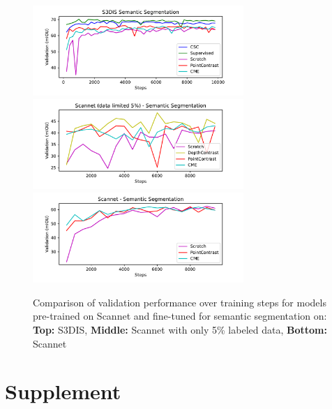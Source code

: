 \documentclass[10pt,twocolumn,letterpaper]{article}
\begin{document}
\begin{figure}[h!]
    \centering
    \includegraphics[width=8cm]{images/plots/s3dis_semantic.pdf}
    \includegraphics[width=8cm]{images/plots/scannet_0.05_semantic.pdf}
    \includegraphics[width=8cm]{images/plots/scannet_semantic.pdf}
    \caption{Comparison of validation performance over training steps for models pre-trained on Scannet and fine-tuned for semantic segmentation on: \textbf{Top:} S3DIS, \textbf{Middle:} Scannet with only 5\% labeled data, \textbf{Bottom:} Scannet}
    \label{fig:validationComparison}
\end{figure}


\clearpage
{\small
    
    
}

\clearpage
\section{Supplement}
\end{document}
